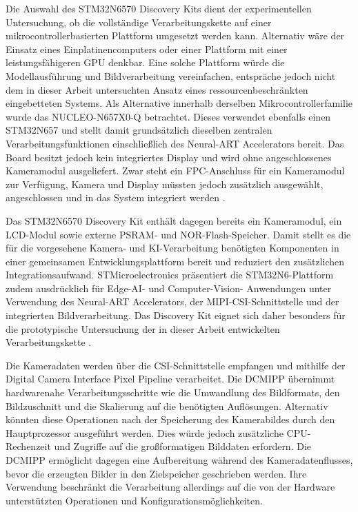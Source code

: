 Die Auswahl des STM32N6570 Discovery Kits dient der experimentellen Untersuchung, ob die vollständige Verarbeitungskette auf einer mikrocontrollerbasierten Plattform umgesetzt werden kann. Alternativ wäre der Einsatz eines Einplatinencomputers oder einer Plattform mit einer leistungsfähigeren GPU denkbar. Eine solche Plattform würde die Modellausführung und Bildverarbeitung vereinfachen, entspräche jedoch nicht dem in dieser Arbeit untersuchten Ansatz eines ressourcenbeschränkten eingebetteten Systems. Als Alternative innerhalb derselben Mikrocontrollerfamilie wurde das NUCLEO-N657X0-Q betrachtet. Dieses verwendet ebenfalls einen STM32N657 und stellt damit grundsätzlich dieselben zentralen Verarbeitungsfunktionen einschließlich des Neural-ART Accelerators bereit. Das Board besitzt jedoch kein integriertes Display und wird ohne angeschlossenes Kameramodul ausgeliefert. Zwar steht ein FPC-Anschluss für ein Kameramodul zur Verfügung, Kamera und Display müssten jedoch zusätzlich ausgewählt, angeschlossen und in das System integriert werden \cite{STMicroelectronicsNUCLEON657X0Q}.

Das STM32N6570 Discovery Kit enthält dagegen bereits ein Kameramodul, ein LCD-Modul sowie externe PSRAM- und NOR-Flash-Speicher. Damit stellt es die für die vorgesehene Kamera- und KI-Verarbeitung benötigten Komponenten in einer gemeinsamen Entwicklungsplattform bereit und reduziert den zusätzlichen Integrationsaufwand. STMicroelectronics präsentiert die STM32N6-Plattform zudem ausdrücklich für Edge-AI- und Computer-Vision- \linebreak Anwendungen unter Verwendung des Neural-ART Accelerators, der MIPI-CSI-Schnittstelle und der integrierten Bildverarbeitung. Das Discovery Kit eignet sich daher besonders für die prototypische Untersuchung der in dieser Arbeit entwickelten Verarbeitungskette \cite{STM32N6570DKProductSTMicroelectronics}.

Die Kameradaten werden über die CSI-Schnittstelle empfangen und mithilfe der Digital Camera Interface Pixel Pipeline verarbeitet. Die DCMIPP übernimmt hardwarenahe Verarbeitungsschritte wie die Umwandlung des Bildformats, den Bildzuschnitt und die Skalierung auf die benötigten Auflösungen. Alternativ könnten diese Operationen nach der Speicherung des Kamerabildes durch den Hauptprozessor ausgeführt werden. Dies würde jedoch zusätzliche CPU-Rechenzeit und Zugriffe auf die großformatigen Bilddaten erfordern. Die DCMIPP ermöglicht dagegen eine Aufbereitung während des Kameradatenflusses, bevor die erzeugten Bilder in den Zielspeicher geschrieben werden. Ihre Verwendung beschränkt die Verarbeitung allerdings auf die von der Hardware unterstützten Operationen und Konfigurationsmöglichkeiten.

